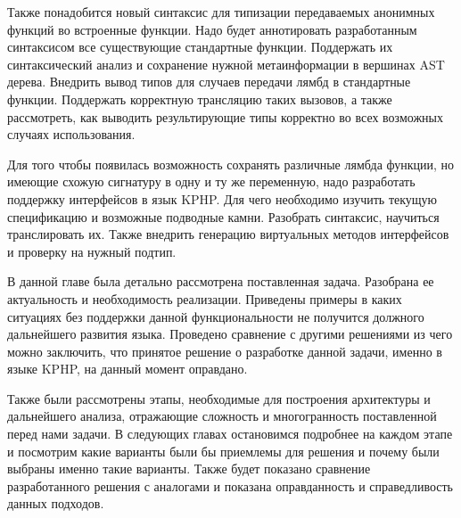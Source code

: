 Также понадобится новый синтаксис для типизации передаваемых анонимных функций во встроенные функции.
Надо будет аннотировать разработанным синтаксисом все существующие стандартные функции.
Поддержать их синтаксический анализ и сохранение нужной метаинформации в вершинах AST дерева.
Внедрить вывод типов для случаев передачи лямбд в стандартные функции.
Поддержать корректную трансляцию таких вызовов, а также рассмотреть, как выводить результирующие типы корректно во всех возможных случаях использования.

Для того чтобы появилась возможность сохранять различные лямбда функции, но имеющие схожую сигнатуру в одну и ту же переменную, надо разработать поддержку интерфейсов в язык KPHP.
Для чего необходимо изучить текущую спецификацию и возможные подводные камни.
Разобрать синтаксис, научиться транслировать их.
Также внедрить генерацию виртуальных методов интерфейсов и проверку на нужный подтип.

\chapterconclusion
В данной главе была детально рассмотрена поставленная задача.
Разобрана ее актуальность и необходимость реализации.
Приведены примеры в каких ситуациях без поддержки данной функциональности не получится должного дальнейшего развития языка.
Проведено сравнение с другими решениями из чего можно заключить, что принятое решение о разработке данной задачи, именно в языке KPHP, на данный момент оправдано.

Также были рассмотрены этапы, необходимые для построения архитектуры и дальнейшего анализа, отражающие сложность и многогранность поставленной перед нами задачи.
В следующих главах остановимся подробнее на каждом этапе и посмотрим какие варианты были бы приемлемы для решения и почему были выбраны именно такие варианты.
Также будет показано сравнение разработанного решения с аналогами и показана оправданность и справедливость данных подходов.
